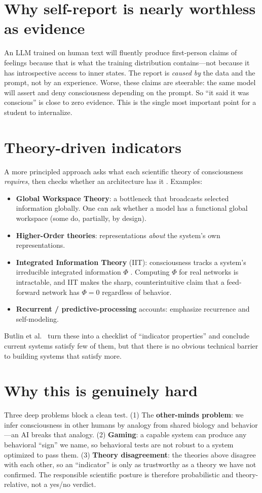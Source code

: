 \documentclass[11pt]{article}
\begin{document}
\section{Why self-report is nearly worthless as evidence}
An LLM trained on human text will fluently produce first-person claims of feelings because that is what
the training distribution contains---not because it has introspective access to inner states. The
report is \emph{caused by} the data and the prompt, not by an experience. Worse, these claims are
steerable: the same model will assert and deny consciousness depending on the prompt. So ``it said it
was conscious'' is close to zero evidence. This is the single most important point for a student to
internalize.

\section{Theory-driven indicators}
A more principled approach asks what each scientific theory of consciousness \emph{requires}, then checks
whether an architecture has it \citep{butlin2023consciousness}. Examples:
\begin{itemize}[leftmargin=1.4em]
\item \textbf{Global Workspace Theory}: a bottleneck that broadcasts selected information globally. One
can ask whether a model has a functional global workspace (some do, partially, by design).
\item \textbf{Higher-Order theories}: representations \emph{about} the system's own representations.
\item \textbf{Integrated Information Theory} (IIT): consciousness tracks a system's irreducible
integrated information $\Phi$ \citep{tononi2016iit}. Computing $\Phi$ for real networks is intractable,
and IIT makes the sharp, counterintuitive claim that a feed-forward network has $\Phi=0$ regardless of
behavior.
\item \textbf{Recurrent / predictive-processing} accounts: emphasize recurrence and self-modeling.
\end{itemize}
Butlin et al.\ \citeyearpar{butlin2023consciousness} turn these into a checklist of ``indicator
properties'' and conclude current systems satisfy few of them, but that there is no obvious technical
barrier to building systems that satisfy more.

\section{Why this is genuinely hard}
Three deep problems block a clean test. (1) The \textbf{other-minds problem}: we infer consciousness in
other humans by analogy from shared biology and behavior---an AI breaks that analogy. (2) \textbf{Gaming}:
a capable system can produce any behavioral ``sign'' we name, so behavioral tests are not robust to a
system optimized to pass them. (3) \textbf{Theory disagreement}: the theories above disagree with each
other, so an ``indicator'' is only as trustworthy as a theory we have not confirmed. The responsible
scientific posture is therefore probabilistic and theory-relative, not a yes/no verdict.
\end{document}
